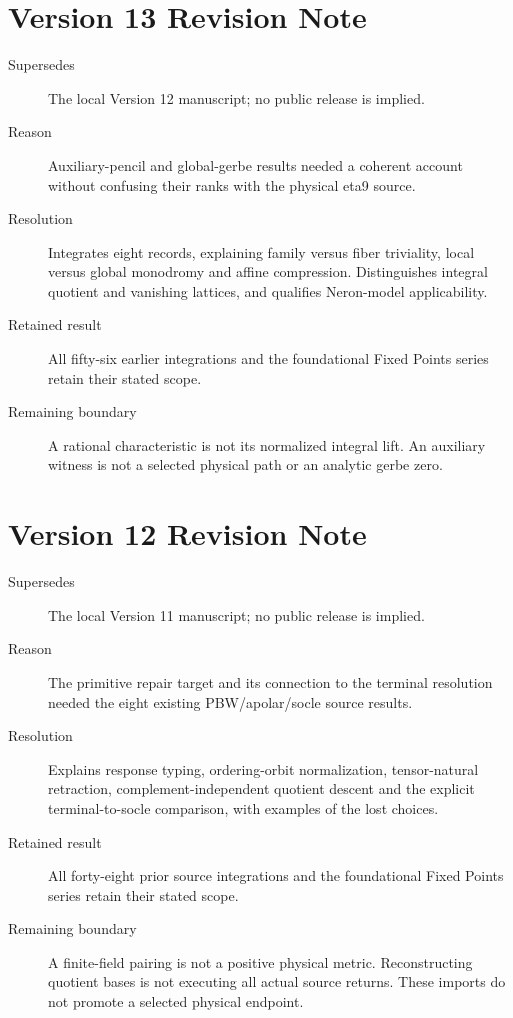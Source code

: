 \documentclass[11pt,a4paper]{article}
\begin{document}
\section*{Version 13 Revision Note}
\begin{description}
\item[Supersedes] The local Version 12 manuscript; no public release is implied.
\item[Reason] Auxiliary-pencil and global-gerbe results needed a coherent
account without confusing their ranks with the physical eta9 source.
\item[Resolution] Integrates eight records, explaining family versus fiber
triviality, local versus global monodromy and affine compression. Distinguishes
integral quotient and vanishing lattices, and qualifies Neron-model applicability.
\item[Retained result] All fifty-six earlier integrations and the
foundational Fixed Points series retain their stated scope.
\item[Remaining boundary] A rational characteristic is not its normalized
integral lift. An auxiliary witness is not a selected physical path or
an analytic gerbe zero.
\end{description}

\section*{Version 12 Revision Note}
\begin{description}
\item[Supersedes] The local Version 11 manuscript; no public release is implied.
\item[Reason] The primitive repair target and its connection to the terminal
resolution needed the eight existing PBW/apolar/socle source results.
\item[Resolution] Explains response typing, ordering-orbit normalization,
tensor-natural retraction, complement-independent quotient descent and the
explicit terminal-to-socle comparison, with examples of the lost choices.
\item[Retained result] All forty-eight prior source integrations and the
foundational Fixed Points series retain their stated scope.
\item[Remaining boundary] A finite-field pairing is not a positive physical
metric. Reconstructing quotient bases is not executing all actual source
returns. These imports do not promote a selected physical endpoint.
\end{description}
\end{document}
